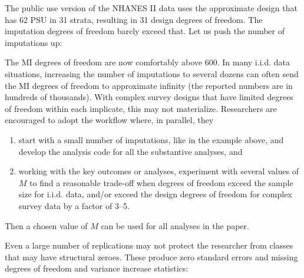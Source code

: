 \begin{stlog}
\nullskip
\end{stlog}

The public use version of the NHANES II data uses the approximate
design that has 62 PSU in 31 strata, resulting in 31 design degrees 
of freedom. The imputation degrees of freedom barely exceed that.
Let us push the number of imputations up:

\begin{stlog}
\nullskip
\end{stlog}

The MI degrees of freedom are now comfortably above 600.
In many i.i.d. data situations, increasing the number of imputations
to several dozens can often send the MI degrees of freedom to 
approximate infinity (the reported numbers are in hundreds 
of thousands). With complex survey designs that have limited
degrees of freedom within each implicate, this may not materialize.
Researchers are encouraged to adopt the workflow where, in parallel,
they

\begin{enumerate}
  \item start with a small number of imputations, like 
        in the example above, and develop the analysis code for all
        the substantive analyses, and
  \item working with the key outcomes or analyses, 
        experiment with several values of $M$ to find a reasonable
        trade-off when degrees of freedom exceed the sample size 
        for i.i.d. data, and/or exceed the design degrees of freedom
        for complex survey data by a factor of 3--5.
\end{enumerate}

Then a chosen value of $M$ can be used for all analyses in the paper.

Even a large number of replications may not protect the researcher
from classes that may have structural zeroes. These produce
zero standard errors and missing degrees of freedom and 
variance increase statistics:

\begin{stlog}
\nullskip
\end{stlog}



\newpage

% 
% 

